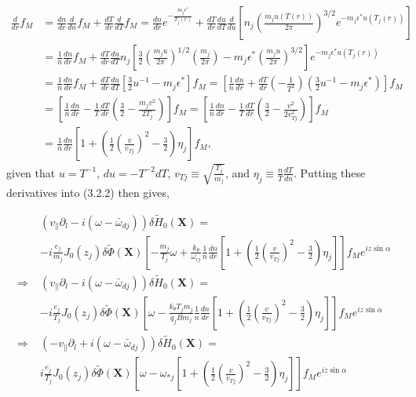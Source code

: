 \documentclass[12pt]{article}
\numberwithin{equation}{subsection}
\begin{document}
   \begin{equation}
   \begin{aligned}
      \frac{d}{dr}f_M &= \frac{dn}{dr}\frac{d}{dn}f_M + \frac{dT}{dr}\frac{d}{dT}f_M = 
                         \frac{dn}{dr}e^{-\frac{m_j \epsilon^*}{T_j(r)}} + 
                         \frac{dT}{dr}\frac{du}{dT}\frac{d}{du}[n_j\left(\frac{m_j u(T(r))}{2\pi}\right)^{3/2}e^{-m_j \epsilon^* u(T_j(r))}] \\
                      &= \frac{1}{n}\frac{dn}{dr}f_M + \frac{dT}{dr}\frac{du}{dT}n_j[\frac{3}{2}\left(\frac{m_ju}{2\pi}\right)^{1/2}
                         \left(\frac{m_j}{2\pi}\right) - m_j\epsilon^*\left(\frac{m_ju}{2\pi}\right)^{3/2}]e^{-m_j \epsilon^* u(T_j(r))} \\
                      &= \frac{1}{n}\frac{dn}{dr}f_M + \frac{dT}{dr}\frac{du}{dT}[\frac{3}{2}u^{-1} - m_j\epsilon^*]f_M
                       = [\frac{1}{n}\frac{dn}{dr} + \frac{dT}{dr}(-\frac{1}{T^2})(\frac{3}{2}u^{-1} - m_j\epsilon^*)]f_M \\
                      &= [\frac{1}{n}\frac{dn}{dr} - \frac{1}{T}\frac{dT}{dr}(\frac{3}{2} - \frac{m_jv^2}{2T_j})]f_M
                       = [\frac{1}{n}\frac{dn}{dr} - \frac{1}{T}\frac{dT}{dr}(\frac{3}{2} - \frac{v^2}{2v_{Tj}^2})]f_M \\
                      &= \frac{1}{n}\frac{dn}{dr}[1 + (\frac{1}{2}\left(\frac{v}{v_{Tj}}\right)^2 - \frac{3}{2})\eta_j]f_M,
   \end{aligned}
   \end{equation}
given that $u = T^{-1}$, $du = -T^{-2}dT$, $v_{Tj} \equiv \sqrt{\frac{T_j}{m_j}}$, and $\eta_j \equiv \frac{n}{T}\frac{dT}{dn}$. Putting these
derivatives into (3.2.2) then gives,
   
   \begin{equation}
   \begin{aligned}
      &(v_\parallel\partial_l - i(\omega - \bar{\omega}_{dj}))\delta\widetilde{H}_0(\bm{X}) = \\ &-i\frac{e_j}{m_j}J_0(z_j)\delta\widetilde{\Phi}(\bm{X})
          [-\frac{m_j}{T_j}\omega + \frac{k_\theta}{\omega_{cj}}\frac{1}{n}\frac{dn}{dr}[1 + (\frac{1}{2}\left(\frac{v}{v_{Tj}}\right)^2
           - \frac{3}{2})\eta_j]]f_Me^{iz\sin\alpha} \\
      \Rightarrow\; &(v_\parallel\partial_l - i(\omega - \bar{\omega}_{dj}))\delta\widetilde{H}_0(\bm{X}) = \\ &-i\frac{e_j}{T_j}J_0(z_j)\delta\widetilde{\Phi}(\bm{X})
          [\omega - \frac{k_\theta T_j m_j}{q_j B m_j}\frac{1}{n}\frac{dn}{dr}[1 + (\frac{1}{2}\left(\frac{v}{v_{Tj}}\right)^2
           - \frac{3}{2})\eta_j]]f_Me^{iz\sin\alpha} \\
      \Rightarrow\; &(-v_\parallel\partial_l + i(\omega - \bar{\omega}_{dj}))\delta\widetilde{H}_0(\bm{X}) = \\ &i\frac{e_j}{T_j}J_0(z_j)\delta\widetilde{\Phi}(\bm{X})
          [\omega - \omega_{*j}[1 + (\frac{1}{2}\left(\frac{v}{v_{Tj}}\right)^2- \frac{3}{2})\eta_j]]f_Me^{iz\sin\alpha}
   \end{aligned}
   \end{equation}
\end{document}
